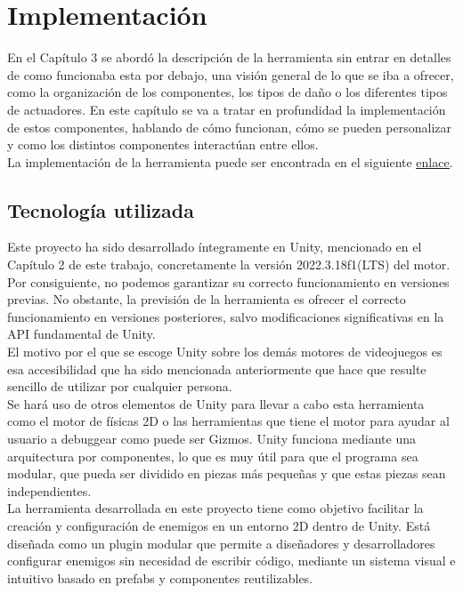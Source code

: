 \setcounter{secnumdepth}{3} %
\chapter{Implementaci\'on}
\label{cap:implementacion}
En el Capítulo 3 se abordó la descripción de la herramienta sin entrar en detalles de como funcionaba esta por debajo, una visión general de lo que se iba a ofrecer, como la organización de los componentes, los tipos de daño o los diferentes tipos de actuadores. En este capítulo se va a tratar en profundidad la implementación de estos componentes, hablando de cómo funcionan, cómo se pueden personalizar y como los distintos componentes interactúan entre ellos.\\

La implementación de la herramienta puede ser encontrada en el siguiente \href{https://github.com/CiscoGalvan/TFG}{\underline{enlace}}.


\section{Tecnología utilizada}
Este proyecto ha sido desarrollado íntegramente en Unity, mencionado en el Capítulo 2 de este trabajo, concretamente la versión 2022.3.18f1(LTS) del motor. Por consiguiente, no podemos garantizar su correcto funcionamiento en versiones previas. No obstante, la previsión de la herramienta es ofrecer el correcto funcionamiento en versiones posteriores, salvo modificaciones significativas en la API fundamental de Unity.\\

El motivo por el que se escoge Unity sobre los demás motores de videojuegos es esa accesibilidad que ha sido mencionada anteriormente que hace que resulte sencillo de utilizar por cualquier persona. \\

Se hará uso de otros elementos de Unity para llevar a cabo esta herramienta como el motor de físicas 2D o las herramientas que tiene el motor para ayudar al usuario a debuggear como puede ser Gizmos.
Unity funciona mediante una arquitectura por componentes, lo que es muy útil para que el programa sea modular, que pueda ser dividido en piezas más pequeñas y que estas piezas sean independientes.\\

La herramienta desarrollada en este proyecto tiene como objetivo facilitar la creación y configuración de enemigos en un entorno 2D dentro de Unity. Está diseñada como un plugin modular que permite a diseñadores y desarrolladores configurar enemigos sin necesidad de escribir código, mediante un sistema visual e intuitivo basado en prefabs y componentes reutilizables.\\

